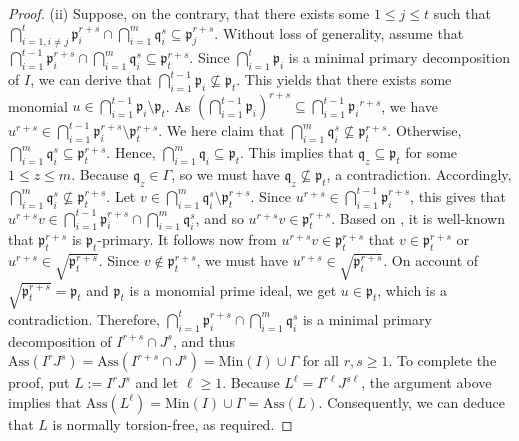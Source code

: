 \documentclass[11pt]{amsart}
\begin{document}
\begin{proof}
  (ii)  Suppose, on the contrary, that  there exists some $1\leq j \leq t$ such that
   $\bigcap_{i=1,i\neq j}^{t}{\mathfrak{p}^{r+s}_i}\cap   \bigcap_{i=1}^{m}{\mathfrak{q}^{s}_i}   
  \subseteq \mathfrak{p}^{r+s}_j$. Without loss of generality,  assume that  $\bigcap_{i=1}^{t-1}{\mathfrak{p}^{r+s}_i}\cap 
  \bigcap_{i=1}^{m}{\mathfrak{q}^{s}_i}   \subseteq \mathfrak{p}^{r+s}_{t}$. 
  Since $\bigcap_{i=1}^{t}{\mathfrak{p}_i}$ is a minimal primary decomposition of $I$, we can derive that 
  $\bigcap_{i=1}^{t-1}{\mathfrak{p}_i}\nsubseteq \mathfrak{p}_{t}$. This yields that there exists some monomial 
  $u\in \bigcap_{i=1}^{t-1}{\mathfrak{p}_i} \setminus  \mathfrak{p}_{t}$. 
  As $(\bigcap_{i=1}^{t-1}{\mathfrak{p}_i})^{r+s} \subseteq \bigcap_{i=1}^{t-1}{\mathfrak{p}_i}^{r+s}$, we have    
  $u^{r+s}\in \bigcap_{i=1}^{t-1}{\mathfrak{p}^{r+s}_i} \setminus  \mathfrak{p}^{r+s}_{t}$. We here claim that 
  $\bigcap_{i=1}^{m}{\mathfrak{q}^{s}_i} \nsubseteq \mathfrak{p}^{r+s}_{t}$. 
  Otherwise, $\bigcap_{i=1}^{m}{\mathfrak{q}^{s}_i}  \subseteq \mathfrak{p}^{r+s}_{t}$. Hence, $\bigcap_{i=1}^{m}{\mathfrak{q}_i}  \subseteq \mathfrak{p}_{t}$. This implies that $\mathfrak{q}_z\subseteq \mathfrak{p}_t$ for some $1\leq z \leq m$. 
     Because $\mathfrak{q}_z\in \Gamma$, so we must have $\mathfrak{q}_z\nsubseteq \mathfrak{p}_t$, a contradiction. 
      Accordingly,   $\bigcap_{i=1}^{m}{\mathfrak{q}^{s}_i} \nsubseteq \mathfrak{p}^{r+s}_{t}$.  
     Let     $v\in \bigcap_{i=1}^{m}{\mathfrak{q}^{s}_i} \setminus \mathfrak{p}^{r+s}_{t}$. Since  $u^{r+s}\in \bigcap_{i=1}^{t-1}{\mathfrak{p}^{r+s}_i}$, this gives that     $u^{r+s}v\in \bigcap_{i=1}^{t-1}{\mathfrak{p}^{r+s}_i} \cap \bigcap_{i=1}^{m}{\mathfrak{q}^{s}_i}$, and so $u^{r+s}v\in \mathfrak{p}^{r+s}_{t}$. Based on     \cite[Corollary 6.1.8]{V1}, it is well-known that  $\mathfrak{p}^{r+s}_{t}$ is $\mathfrak{p}_{t}$-primary. It follows now from     $u^{r+s}v\in \mathfrak{p}^{r+s}_{t}$ that $v\in \mathfrak{p}^{r+s}_{t}$  or  $u^{r+s}\in \sqrt{\mathfrak{p}^{r+s}_{t}}$.
     Since  $v\notin \mathfrak{p}^{r+s}_{t}$, we must have $u^{r+s}\in \sqrt{\mathfrak{p}^{r+s}_{t}}$. 
     On account of $\sqrt{\mathfrak{p}^{r+s}_{t}}=\mathfrak{p}_{t}$ and $\mathfrak{p}_{t}$ is a monomial prime ideal, we get 
     $u\in \mathfrak{p}_{t}$, which is a contradiction. Therefore,  $\bigcap_{i=1}^{t}{\mathfrak{p}^{r+s}_i} \cap \bigcap_{i=1}^{m}{\mathfrak{q}^{s}_i}$ is a minimal primary decomposition of  $I^{r+s} \cap J^s$, and thus $\mathrm{Ass}(I^rJ^s)=\mathrm{Ass}(I^{r+s}\cap J^s)=\mathrm{Min}(I) \cup \Gamma$ 
     for all $r,s\geq 1$. To complete the proof, put $L:=I^rJ^s$ and let $\ell \geq 1$.  Because $L^\ell=I^{r\ell} J^{s\ell}$, the  argument above implies that 
     $\mathrm{Ass}(L^\ell)=\mathrm{Min}(I) \cup \Gamma=\mathrm{Ass}(L)$. Consequently, we can deduce that $L$ is normally torsion-free, as required.  
\end{proof}
\end{document}
